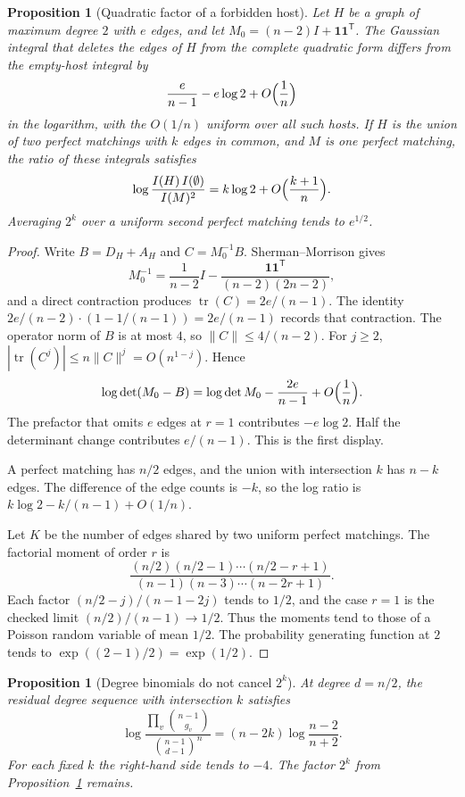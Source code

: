 \documentclass[11pt]{article}
\newtheorem{proposition}[theorem]{Proposition}
\begin{document}
\begin{proposition}[Quadratic factor of a forbidden host]
\label{prop:quad-host}
Let \(H\) be a graph of maximum degree \(2\) with \(e\) edges, and let \(M_0=(n-2)I+{\mathbf 1}{\mathbf 1}^{\mathsf T}\).
The Gaussian integral that deletes the edges of \(H\) from the complete quadratic form differs from the empty-host integral by
\[
\frac{e}{n-1}-e\log 2+O\Bigl(\frac1n\Bigr)
\]
in the logarithm, with the \(O(1/n)\) uniform over all such hosts.
If \(H\) is the union of two perfect matchings with \(k\) edges in common, and \(M\) is one perfect matching, the ratio of these integrals satisfies
\[
\log\frac{I(H)\,I(\emptyset)}{I(M)^2}=k\log 2+O\Bigl(\frac{k+1}{n}\Bigr).
\]
Averaging \(2^{k}\) over a uniform second perfect matching tends to \(e^{1/2}\).
\end{proposition}

\begin{proof}
Write \(B=D_H+A_H\) and \(C=M_0^{-1}B\). Sherman--Morrison gives
\[
M_0^{-1}=\frac1{n-2}I-\frac{{\mathbf 1}{\mathbf 1}^{\mathsf T}}{(n-2)(2n-2)},
\]
and a direct contraction produces \(\operatorname{tr}(C)=2e/(n-1)\). The identity
\(2e/(n-2)\cdot(1-1/(n-1))=2e/(n-1)\) records that contraction.
The operator norm of \(B\) is at most \(4\), so \(\|C\|\le 4/(n-2)\).
For \(j\ge 2\), \(|\operatorname{tr}(C^j)|\le n\|C\|^j=O(n^{1-j})\).
Hence
\[
\log\det(M_0-B)=\log\det M_0-\frac{2e}{n-1}+O\Bigl(\frac1n\Bigr).
\]
The prefactor that omits \(e\) edges at \(r=1\) contributes \(-e\log 2\).
Half the determinant change contributes \(e/(n-1)\). This is the first display.

A perfect matching has \(n/2\) edges, and the union with intersection \(k\) has \(n-k\) edges.
The difference of the edge counts is \(-k\), so the log ratio is
\(k\log 2-k/(n-1)+O(1/n)\).

Let \(K\) be the number of edges shared by two uniform perfect matchings.
The factorial moment of order \(r\) is
\[
\frac{(n/2)(n/2-1)\cdots(n/2-r+1)}{(n-1)(n-3)\cdots(n-2r+1)}.
\]
Each factor \((n/2-j)/(n-1-2j)\) tends to \(1/2\), and the case \(r=1\) is the checked limit \((n/2)/(n-1)\to 1/2\).
Thus the moments tend to those of a Poisson random variable of mean \(1/2\).
The probability generating function at \(2\) tends to \(\exp((2-1)/2)=\exp(1/2)\).
\end{proof}

\begin{proposition}[Degree binomials do not cancel \(2^k\)]
\label{prop:degree-binomial}
At degree \(d=n/2\), the residual degree sequence with intersection \(k\) satisfies
\[
\log\frac{\prod_v\binom{n-1}{g_v}}{\binom{n-1}{d-1}^n}
=
(n-2k)\log\frac{n-2}{n+2}.
\]
For each fixed \(k\) the right-hand side tends to \(-4\). The factor \(2^k\) from Proposition~\ref{prop:quad-host} remains.
\end{proposition}
\end{document}
